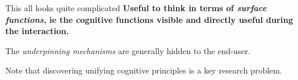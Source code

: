 \documentclass[compress]{beamer}
\begin{document}

\begin{frame}{This all looks quite complicated}
    \bf
    Useful to think in terms of \emph{surface functions}, ie the cognitive
    functions visible and directly useful during the interaction.
    
    \pause

    The \emph{underpinning mechanisms} are generally hidden to the end-user.
    
    \pause
    
    Note that discovering unifying cognitive principles is a key research problem.
\end{frame}

\end{document}
